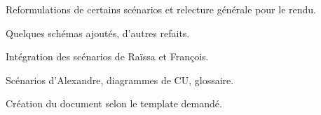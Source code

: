 
Reformulations de certains scénarios et relecture générale pour le rendu.
\par
{}
Quelques schémas ajoutés, d'autres refaits.
\par
{}
Intégration des scénarios de Raïssa et François.
\par
{} 
Scénarios d'Alexandre, diagrammes de CU, glossaire.
\par
{} 
Création du document selon le template demandé.
\par
